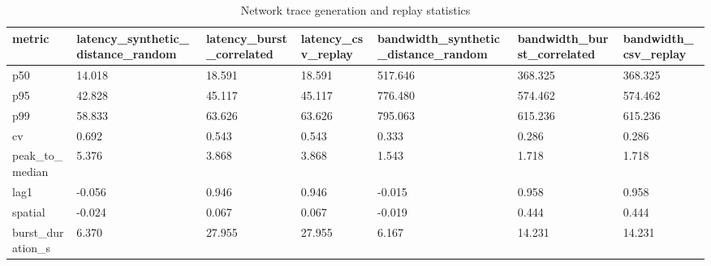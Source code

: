 \begin{table}[t]
\centering
\caption{Network trace generation and replay statistics}
\label{tab:network_trace_provider_metrics}
\scriptsize
\begin{tabular}{lllllll}
\toprule
metric & latency\_synthetic\_distance\_random & latency\_burst\_correlated & latency\_csv\_replay & bandwidth\_synthetic\_distance\_random & bandwidth\_burst\_correlated & bandwidth\_csv\_replay \\
\midrule
p50 & 14.018 & 18.591 & 18.591 & 517.646 & 368.325 & 368.325 \\
p95 & 42.828 & 45.117 & 45.117 & 776.480 & 574.462 & 574.462 \\
p99 & 58.833 & 63.626 & 63.626 & 795.063 & 615.236 & 615.236 \\
cv & 0.692 & 0.543 & 0.543 & 0.333 & 0.286 & 0.286 \\
peak\_to\_median & 5.376 & 3.868 & 3.868 & 1.543 & 1.718 & 1.718 \\
lag1 & -0.056 & 0.946 & 0.946 & -0.015 & 0.958 & 0.958 \\
spatial & -0.024 & 0.067 & 0.067 & -0.019 & 0.444 & 0.444 \\
burst\_duration\_s & 6.370 & 27.955 & 27.955 & 6.167 & 14.231 & 14.231 \\
\bottomrule
\end{tabular}
\end{table}
